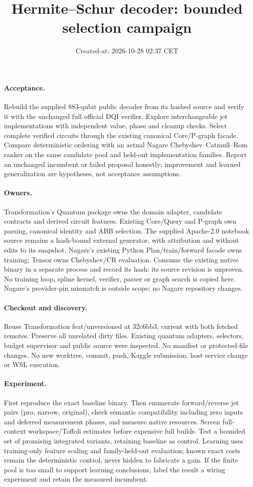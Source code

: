 \documentclass{article}
\title{Hermite--Schur decoder: bounded selection campaign}
\date{Created-at: 2026-10-28 02:37 CET}
\begin{document}
\maketitle
\paragraph{Acceptance.} Rebuild the supplied 883-qubit public decoder from its
hashed source and verify it with the unchanged full official DQI verifier.
Explore interchangeable jet implementations with independent value, phase and
cleanup checks. Select complete verified circuits through the existing canonical
Core/P-graph facade. Compare deterministic ordering with an actual Nagare
Chebyshev--Catmull--Rom ranker on the same candidate pool and held-out implementation
families. Report an unchanged incumbent or failed proposal honestly; improvement
and learned generalization are hypotheses, not acceptance assumptions.
\paragraph{Owners.} Transformation's Quantum package owns the domain adapter,
candidate contracts and derived circuit features. Existing Core/Query and P-graph
own parsing, canonical identity and ABB selection. The supplied Apache-2.0
notebook source remains a hash-bound external generator, with attribution and
without edits to its snapshot. Nagare's existing Python Plan/train/forward facade
owns training; Tensor owns Chebyshev/CR evaluation. Consume the existing native
binary in a separate process and record its hash: its source revision is unproven.
No training loop, spline kernel, verifier, parser or graph search is copied here.
Nagare's provider-pin mismatch is outside scope; no Nagare repository changes.
\paragraph{Checkout and discovery.} Reuse Transformation feat/unversioned at
32c6bb3, current with both fetched remotes. Preserve all unrelated dirty files.
Existing quantum adapters, selectors, budget supervisor and public source were
inspected. No manifest or protected-file changes. No new worktree, commit, push,
Kaggle submission, host service change or WSL execution.
\paragraph{Experiment.} First reproduce the exact baseline binary. Then enumerate
forward/reverse jet pairs (pro, narrow, original), check semantic compatibility
including zero inputs and deferred measurement phases, and measure native resources.
Screen full-context workspace/Toffoli estimates before expensive full builds.
Test a bounded set of promising integrated variants, retaining baseline as control.
Learning uses training-only feature scaling and family-held-out evaluation; known
exact costs remain the deterministic control, never hidden to fabricate a gain.
If the finite pool is too small to support learning conclusions, label the result
a wiring experiment and retain the measured incumbent.
\end{document}
